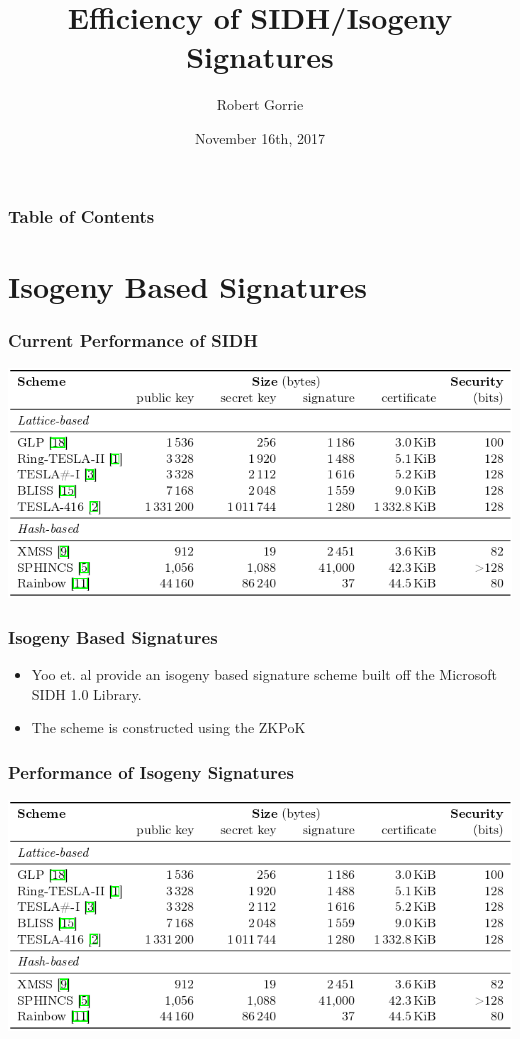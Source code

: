 \documentclass{beamer}
\title[SIDH]{Efficiency of SIDH/Isogeny Signatures}
\author{Robert Gorrie}
\institute[Comp Sci 2S03]{Department of Computing \& Software, McMaster University}
\date{November 16th, 2017}
\begin{document}
\begin{frame}
\titlepage
\end{frame}

\begin{frame}
\frametitle{Table of Contents}
\tableofcontents
\end{frame}


\section{Isogeny Based Signatures}


\begin{frame}
\frametitle{Current Performance of SIDH}
\includegraphics[scale=0.43]{sigcomparison.png}
\end{frame}

\begin{frame}
\frametitle{Isogeny Based Signatures}
\begin{itemize}
\item Yoo et. al provide an isogeny based signature scheme built off the Microsoft SIDH 1.0 Library.
\item The scheme is constructed using the ZKPoK 
\end{itemize}
\end{frame}

\begin{frame}
\frametitle{Performance of Isogeny Signatures}
\includegraphics[scale=0.43]{sigcomparison.png}
\end{frame}
\end{document}
